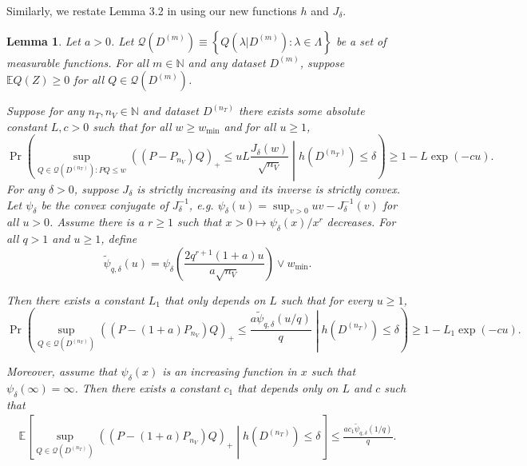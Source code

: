 \documentclass[10pt]{book}
\newtheorem{lemma}{Lemma}
\theoremstyle{definition}
\begin{document}
Similarly, we restate Lemma 3.2 in \citet{lecue2012oracle} using our new functions $h$ and $J_\delta$.
\begin{lemma}
	Let $a>0$. Let $\mathcal{Q}(D^{(m)})\equiv\left\{ Q(\lambda|D^{(m)}):\lambda\in\Lambda\right\} $
	be a set of measurable functions.
	For all $m\in\mathbb{N}$ and any dataset $D^{(m)}$, suppose $\mathbb{E}Q(Z)\ge 0 $ for all $Q\in\mathcal{Q}\left(D^{(m)}\right)$.

	Suppose for any $n_{T},n_{V}\in\mathbb{N}$ and dataset $D^{(n_{T})}$
	there exists some absolute constant $L,c>0$ such that for all $w\ge w_{\min}$
	and for all $u\ge1$,
	\[
	\Pr\left(
	\sup_{Q\in\mathcal{Q}(D^{(n_{T})}): PQ \le w}
	\left(\left({P}-P_{n_{V}}\right)Q\right)_{+}\le uL\frac{J_{\delta}(w)}{\sqrt{n_{V}}}
	\middle |
	h\left(D^{(n_{T})}\right)\le\delta\right)
	\ge 1-L\exp(-cu).
	\]
	For any $\delta > 0$, suppose $J_{\delta}$ is strictly increasing and its inverse is strictly convex.
	Let $\psi_{\delta}$ be the convex conjugate of $J_{\delta}^{-1}$,
	e.g. $\psi_{\delta}(u)=\sup_{v>0}uv-J_{\delta}^{-1}(v)$ for all $u>0$.
	Assume there is a $r\ge1$ such that $x>0\mapsto\psi_\delta(x)/x^{r}$ decreases.
	For all $q>1$ and $u\ge1$, define
	\[
	\tilde \psi_{q,\delta}(u)=\psi_{\delta}\left(\frac{2q^{r+1}(1+a)u}{a\sqrt{n_{V}}}\right)\vee w_{\min}.
	\]
	
	
	Then there exists a constant $L_{1}$ that only depends on $L$ such
	that for every $u\ge1$,
	\[
	\Pr\left(
	\sup_{Q\in\mathcal{Q}(D^{(n_{T})})}
	\left(\left({P}-(1+a)P_{n_{V}}\right)Q\right)_{+}
	\le \frac{a \tilde{\psi}_{q,\delta}(u/q)}{q}
	\middle | h\left(D^{(n_{T})}\right)\le\delta
	\right)
	\ge 1-L_{1}\exp(-cu).
	\]
	
	
	Moreover, assume that $\psi_{\delta}(x)$ is an increasing function in $x$ such that $\psi_{\delta}(\infty)=\infty$.
	Then there exists a constant $c_{1}$ that depends only on $L$ and $c$ such that
	\begin{align}
	\mathbb{E}\left[\sup_{Q\in\mathcal{Q}(D^{(n_{T})})}
	\left(\left(P-(1+a)P_{n_{V}}\right)Q\right)_{+}
	\middle |
	h\left(D^{(n_{T})}\right)\le\delta
	\right]
	\le\frac{ac_{1} \tilde{\psi}_{q,\delta}(1/q)}{q}.
	\label{eq:lecue_exp_cond}
	\end{align}
\end{lemma}
\end{document}
